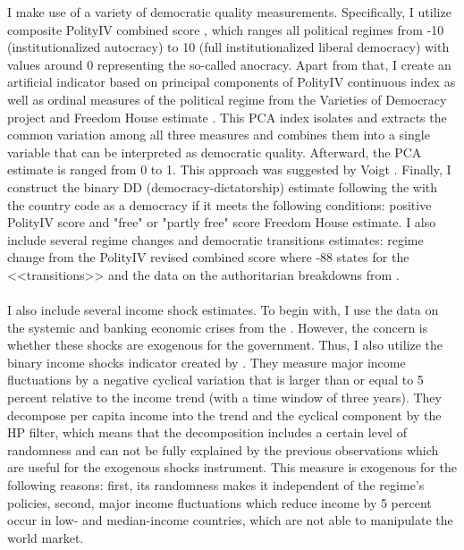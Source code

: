 \documentclass[a4paper, 12pt]{article}
\begin{document}
	\noindent I make use of a variety of democratic quality measurements. Specifically, I utilize composite PolityIV combined score \parencite{polity}, which ranges all political regimes from -10 (institutionalized autocracy) to 10 (full institutionalized liberal democracy) with values around 0 representing the so-called anocracy. Apart from that, I create an artificial indicator based on principal components of PolityIV continuous index as well as ordinal measures of the political regime from the Varieties of Democracy project \parencite{VDemV10} and Freedom House estimate \parencite{freedomhouse}. This PCA index isolates and extracts the common variation among all three measures and combines them into a single variable that can be interpreted as democratic quality. Afterward, the PCA estimate is ranged from 0 to 1. This approach was suggested by Voigt \parencite{voigt_2013}. Finally, I construct the binary DD (democracy-dictatorship) estimate following the \parencite{democracy_growth} with the country code as a democracy if it meets the following conditions: positive PolityIV score and "free" or "partly free" score Freedom House estimate. I also include several regime changes and democratic transitions estimates: regime change from the PolityIV revised combined score where -88 states for the <<transitions>> \parencite{polity} and the data on the authoritarian breakdowns from \parencite{geddesdata}.
	\\\\
    I also include several income shock estimates. To begin with, I use the data on the systemic and banking economic crises from the \cite{bfft}. However, the concern is whether these shocks are exogenous for the government. Thus, I also utilize the binary income shocks indicator created by \cite{sjoe}. They measure major income fluctuations by a negative cyclical variation that is larger than or equal to 5 percent relative to the income trend (with a time window of three years). They decompose per capita income into the trend and the cyclical component by the HP filter, which means that the decomposition includes a certain level of randomness and can not be fully explained by the previous observations which are useful for the exogenous shocks instrument. This measure is exogenous for the following reasons: first, its randomness makes it independent of the regime's policies, second, major income fluctuations which reduce income by 5 percent occur in low- and median-income countries, which are not able to manipulate the world market.
    \\\\
\end{document}
